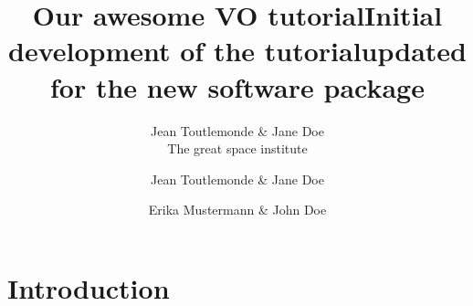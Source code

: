 \documentclass [a4paper, 12pt]{article}
\begin{document}
\author{Jean Toutlemonde \& Jane Doe \\           %
The great space institute }       %
\title{Our awesome VO tutorial}   %
\makeescapetitle
\newpage


\author{Jean Toutlemonde \& Jane Doe}        %
\title{Initial development of the tutorial}  %
\addescapehistory
\author{Erika Mustermann \& John Doe}
\title{updated for the new software package}
\addescapehistory
\newpage


\tableofcontents
\newpage


\section{Introduction}
\end{document}
